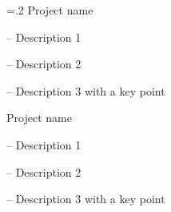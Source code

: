 \vspace{-15mm} %
\begin{multicols}{2}

\hangindent=.2\textwidth
\cventry
    {} %
    {Project name} %
    {} %
    {} %
    {
      \begin{cvitems} %
      	\item[--] Description 1
      	\item[--] Description 2
      	\item[--] Description 3 with a \textcolor{awesome}{key point}
      \end{cvitems}
    }
\vfill\null
\columnbreak
  \cventry
    {} %
    {Project name} %
    {} %
    {} %
    {
      \begin{cvitems} %
      	\item[--] Description 1 %
      	\item[--] Description 2
      	\item[--] Description 3 with a \textcolor{awesome}{key point}
      \end{cvitems}
    }
\end{multicols}